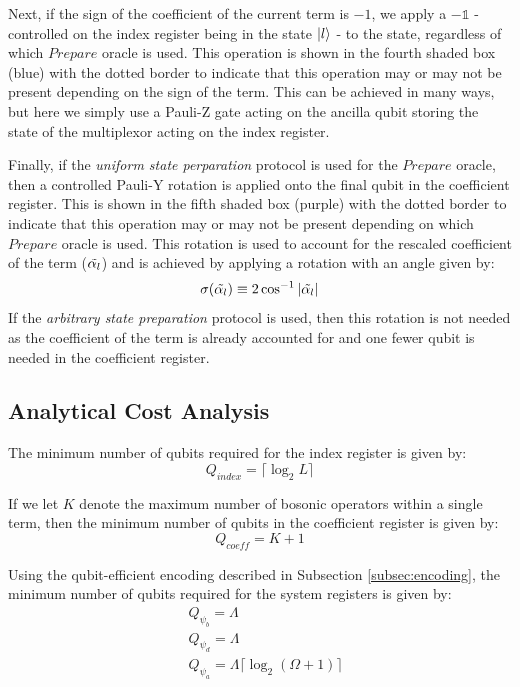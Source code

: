Next, if the sign of the coefficient of the current term is $-1$, we apply a $- \mathds{1}$ - controlled on the index register being in the state $\ket{l}$ - to the state, regardless of which $Prepare$ oracle is used.
This operation is shown in the fourth shaded box (blue) with the dotted border to indicate that this operation may or may not be present depending on the sign of the term.
This can be achieved in many ways, but here we simply use a Pauli-Z gate acting on the ancilla qubit storing the state of the multiplexor acting on the index register.

Finally, if the \textit{uniform state perparation} protocol is used for the $Prepare$ oracle, then a controlled Pauli-Y rotation is applied onto the final qubit in the coefficient register.
This is shown in the fifth shaded box (purple) with the dotted border to indicate that this operation may or may not be present depending on which $Prepare$ oracle is used.
This rotation is used to account for the rescaled coefficient of the term ($\Tilde{\alpha_l}$) and is achieved by applying a rotation with an angle given by:
\begin{equation}
    \sigma(\Tilde{\alpha_l}) \equiv 2 \cos^{-1}{|\Tilde{\alpha_l}|}
\end{equation}
If the \textit{arbitrary state preparation} protocol is used, then this rotation is not needed as the coefficient of the term is already accounted for and one fewer qubit is needed in the coefficient register.


\subsection{Analytical Cost Analysis}
\label{subsec:analytics}

The minimum number of qubits required for the index register is given by:
\begin{equation}
    Q_{\textit{index}} = \lceil \log_2{L} \rceil
\end{equation}

If we let $K$ denote the maximum number of bosonic operators within a single term, then the minimum number of qubits in the coefficient register is given by:
\begin{equation}
    Q_{\textit{coeff}} = K + 1
\end{equation} 

Using the qubit-efficient encoding described in Subsection \ref{subsec:encoding}, the minimum number of qubits required for the system registers is given by:
\begin{equation}
    \begin{split}
        &Q_{\psi_b} = \Lambda \\
        &Q_{\psi_d} = \Lambda \\
        &Q_{\psi_a} = \Lambda \lceil \log_2{(\Omega + 1)} \rceil
    \end{split}
\end{equation} 

